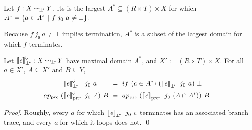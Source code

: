 \documentclass{llncs}
\newcommand{\arrow}{\rightsquigarrow}
\newcommand{\conv}{^{\mspace{-2mu}\Downarrow\mspace{-2mu}}}
\newcommand{\meaningofconv}[1]{\left\llbracket{#1}\right\rrbracket\conv}
\newcommand{\pre}{_\mathrm{pre}}
\newcommand{\pbot}{{\bot^{\mspace{-4mu}*}}}
\DeclareMathOperator{\pbotto}{\arrow_{\mspace{-3mu}\pbot}}
\newcommand{\ppre}{_\mathrm{pre^{\mspace{-2mu}*}}}
\begin{document}
\begin{definition}
\label{def:maximal-domain}
Let $f : X \pbotto Y$.
Its  is the largest $A^* \subseteq (R \times T) \times X$ for which $A^* = \lbrace {a \in A^*} \ \lvert\ {f~j_0~a \neq \bot} \rbrace$.
\end{definition}

Because $f~j_0~a \neq \bot$ implies termination, $A^*$ is a subset of the largest domain for which $f$ terminates.

\begin{comment}

\begin{definition}[index prefix/suffix]
\label{def:index-prefix}
A finite $J' \subset J$ is an \mykeyword{index prefix} if $J' = \set{j_0}$ or, for some index prefix $J''$ and $j \in J''$, $J' = J'' \uplus \set{left~j}$ or $J' = J'' \uplus \set{right~j}$.
The corresponding \mykeyword{index suffix} is $J \w J'$.
\end{definition}

It is not hard to show that every index suffix is closed under $left$ and $right$.

For a given $t \in T$, an index prefix $J'$ serves as a convenient bounding set for the finitely many indexes $j$ for which $t~j \neq \bot$.
Applying $left$ and/or $right$ repeatedly to any $j \in J'$ eventually yields a $j' \in J \w J'$, for which $t~j' = \bot$.
\end{comment}

\begin{theorem}
\label{thm:correct-convergence}
Let $\meaningofconv{\mathit{e}}_\pbot : X \pbotto Y$ have maximal domain $A^*$, and $X' := (R \times T) \times X$.
For all $a \in X'$, $A \subseteq X'$ and $B \subseteq Y$,
\begin{equation}
\begin{aligned}
	&\meaningofconv{\mathit{e}}_\pbot &&\!\!\!\!j_0~a &&\!\!\!\!= \ if~(a \in A^*)~(\meaningof{\mathit{e}}_\pbot~j_0~a)~\bot \\
	ap\pre~(\!&\meaningofconv{\mathit{e}}\ppre &&\!\!\!\!j_0~A)~B &&\!\!\!\!= \ ap\pre~(\meaningof{\mathit{e}}\ppre~j_0~(A \i A^*))~B
\end{aligned}
\end{equation}
\end{theorem}
\begin{proof}
Roughly, every $a$ for which $\meaningof{\mathit{e}}_\pbot~j_0~a$ terminates has an associated branch trace, and every $a$ for which it loops does not.
\qed
\end{proof}
\end{document}
